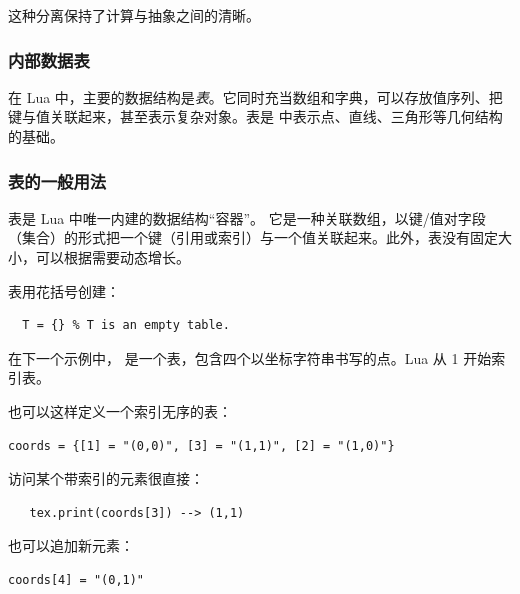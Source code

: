 这种分离保持了计算与抽象之间的清晰。

\subsubsection{内部数据表}

在 Lua 中，主要的数据结构是\emph{表}。它同时充当数组和字典，可以存放值序列、把键与值关联起来，甚至表示复杂对象。表是  中表示点、直线、三角形等几何结构的基础。

\subsubsection{表的一般用法}

表是 Lua 中唯一内建的数据结构“容器”。
它是一种关联数组，以键/值对字段（集合）的形式把一个键（引用或索引）与一个值关联起来。此外，表没有固定大小，可以根据需要动态增长。

表用花括号创建：

\begin{mybox}
\begin{verbatim}
  T = {} % T is an empty table.
\end{verbatim}
\end{mybox}

在下一个示例中， 是一个表，包含四个以坐标字符串书写的点。Lua 从 1 开始索引表。

\begin{tkzexample}[latex=0.35\textwidth]
\end{tkzexample}

也可以这样定义一个索引无序的表：

\begin{mybox}
\begin{verbatim}
coords = {[1] = "(0,0)", [3] = "(1,1)", [2] = "(1,0)"}
\end{verbatim}
\end{mybox}

访问某个带索引的元素很直接：

\begin{verbatim}
   tex.print(coords[3]) --> (1,1)
\end{verbatim}

也可以追加新元素：

\begin{verbatim}
coords[4] = "(0,1)"
\end{verbatim}

